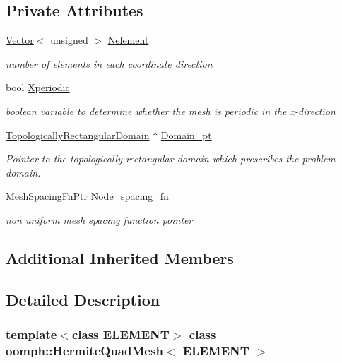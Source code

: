 \subsection*{Private Attributes}
\begin{DoxyCompactItemize}
\item 
\hyperlink{classoomph_1_1Vector}{Vector}$<$ unsigned $>$ \hyperlink{classoomph_1_1HermiteQuadMesh_a0d02ca1a2769955ce57f09616195bd27}{Nelement}
\begin{DoxyCompactList}\small\item\em number of elements in each coordinate direction \end{DoxyCompactList}\item 
bool \hyperlink{classoomph_1_1HermiteQuadMesh_af1c2c974dc0d2e599b6bbe3921c5bb77}{Xperiodic}
\begin{DoxyCompactList}\small\item\em boolean variable to determine whether the mesh is periodic in the x-\/direction \end{DoxyCompactList}\item 
\hyperlink{classoomph_1_1TopologicallyRectangularDomain}{Topologically\+Rectangular\+Domain} $\ast$ \hyperlink{classoomph_1_1HermiteQuadMesh_af6bae1864691e8fe94d7c61995ae560a}{Domain\+\_\+pt}
\begin{DoxyCompactList}\small\item\em Pointer to the topologically rectangular domain which prescribes the problem domain. \end{DoxyCompactList}\item 
\hyperlink{classoomph_1_1HermiteQuadMesh_abebf4806b300591f976398404ed0ef3f}{Mesh\+Spacing\+Fn\+Ptr} \hyperlink{classoomph_1_1HermiteQuadMesh_a3b3cc55576538fc29e6975def870536f}{Node\+\_\+spacing\+\_\+fn}
\begin{DoxyCompactList}\small\item\em non uniform mesh spacing function pointer \end{DoxyCompactList}\end{DoxyCompactItemize}
\subsection*{Additional Inherited Members}


\subsection{Detailed Description}
\subsubsection*{template$<$class E\+L\+E\+M\+E\+NT$>$\newline
class oomph\+::\+Hermite\+Quad\+Mesh$<$ E\+L\+E\+M\+E\+N\+T $>$}

